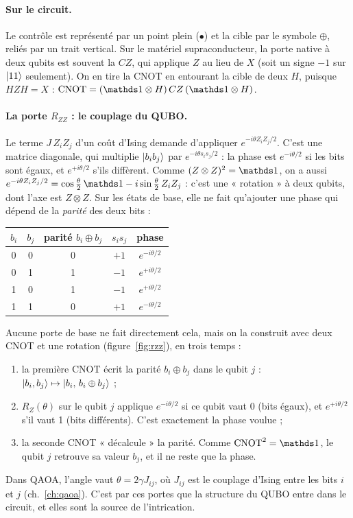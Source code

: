 \paragraph{Sur le circuit.} Le contrôle est représenté par un point plein ($\bullet$) et la cible par le symbole $\oplus$, reliés par un trait vertical. Sur le matériel supraconducteur, la porte native à deux qubits est souvent la $CZ$, qui applique $Z$ au lieu de $X$ (soit un signe $-1$ sur $\lvert 11\rangle$ seulement). On en tire la CNOT en entourant la cible de deux $H$, puisque $HZH=X$ : $\mathrm{CNOT}=(\Id\otimes H)\,CZ\,(\Id\otimes H)$.

\paragraph{La porte $R_{ZZ}$ : le couplage du QUBO.} Le terme $J\,Z_iZ_j$ d'un coût d'Ising demande d'appliquer $e^{-i\theta Z_iZ_j/2}$. C'est une matrice diagonale, qui multiplie $\lvert b_ib_j\rangle$ par $e^{-i\theta s_is_j/2}$ : la phase est $e^{-i\theta/2}$ si les bits sont égaux, et $e^{+i\theta/2}$ s'ils diffèrent. Comme $(Z\otimes Z)^2=\Id$, on a aussi $e^{-i\theta Z_iZ_j/2}=\cos\tfrac\theta2\,\Id-i\sin\tfrac\theta2\,Z_iZ_j$ : c'est une « rotation » à deux qubits, dont l'axe est $Z\otimes Z$. Sur les états de base, elle ne fait qu'ajouter une phase qui dépend de la \emph{parité} des deux bits :
\begin{center}
\begin{tabular}{ccccc}
\toprule
$b_i$ & $b_j$ & parité $b_i\oplus b_j$ & $s_is_j$ & phase \\
\midrule
0 & 0 & 0 & $+1$ & $e^{-i\theta/2}$\\
0 & 1 & 1 & $-1$ & $e^{+i\theta/2}$\\
1 & 0 & 1 & $-1$ & $e^{+i\theta/2}$\\
1 & 1 & 0 & $+1$ & $e^{-i\theta/2}$\\
\bottomrule
\end{tabular}
\end{center}
Aucune porte de base ne fait directement cela, mais on la construit avec deux CNOT et une rotation (figure~\ref{fig:rzz}), en trois temps :
\begin{enumerate}
\item la première CNOT écrit la parité $b_i\oplus b_j$ dans le qubit $j$ : $\lvert b_i,b_j\rangle\mapsto\lvert b_i,\,b_i\oplus b_j\rangle$ ;
\item $R_Z(\theta)$ sur le qubit $j$ applique $e^{-i\theta/2}$ si ce qubit vaut 0 (bits égaux), et $e^{+i\theta/2}$ s'il vaut 1 (bits différents). C'est exactement la phase voulue ;
\item la seconde CNOT « décalcule » la parité. Comme $\mathrm{CNOT}^2=\Id$, le qubit $j$ retrouve sa valeur $b_j$, et il ne reste que la phase.
\end{enumerate}
Dans QAOA, l'angle vaut $\theta=2\gamma J_{ij}$, où $J_{ij}$ est le couplage d'Ising entre les bits $i$ et $j$ (ch.~\ref{ch:qaoa}). C'est par ces portes que la structure du QUBO entre dans le circuit, et elles sont la source de l'intrication.

